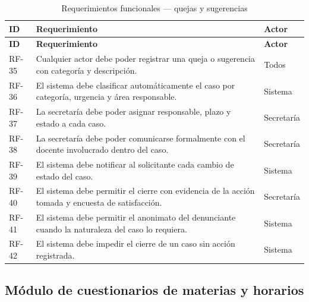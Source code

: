 \begin{longtable}{@{}p{1.5cm} p{6.5cm} p{4.5cm}@{}}
\caption{Requerimientos funcionales --- quejas y sugerencias}
\label{tab:rf-quejas}\\
\toprule
\rowcolor{naranjaClaro}
\textbf{ID} & \textbf{Requerimiento} & \textbf{Actor} \\
\midrule
\endfirsthead
\toprule
\rowcolor{naranjaClaro}
\textbf{ID} & \textbf{Requerimiento} & \textbf{Actor} \\
\midrule
\endhead
RF-35 & Cualquier actor debe poder registrar una queja o sugerencia con categoría y descripción. & Todos \\
RF-36 & El sistema debe clasificar automáticamente el caso por categoría, urgencia y área responsable. & Sistema \\
RF-37 & La secretaría debe poder asignar responsable, plazo y estado a cada caso. & Secretaría \\
RF-38 & La secretaría debe poder comunicarse formalmente con el docente involucrado dentro del caso. & Secretaría \\
RF-39 & El sistema debe notificar al solicitante cada cambio de estado del caso. & Sistema \\
RF-40 & El sistema debe permitir el cierre con evidencia de la acción tomada y encuesta de satisfacción. & Secretaría \\
RF-41 & El sistema debe permitir el anonimato del denunciante cuando la naturaleza del caso lo requiera. & Sistema \\
RF-42 & El sistema debe impedir el cierre de un caso sin acción registrada. & Sistema \\
\bottomrule
\end{longtable}

\subsection{Módulo de cuestionarios de materias y horarios}

